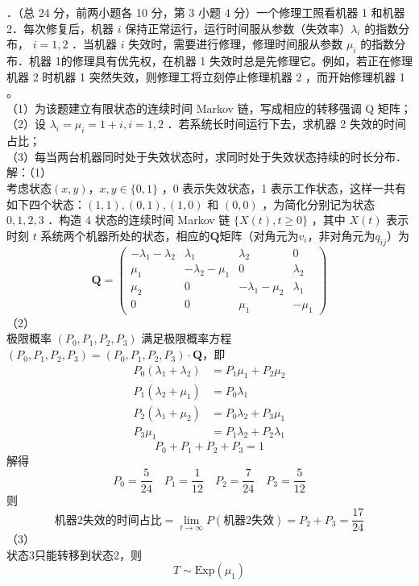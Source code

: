 \documentclass[UTF8,openany]{book}
\begin{document}
．（总 24 分，前两小题各 10 分，第 3 小题 4 分）一个修理工照看机器 1 和机器\\
2．每次修复后，机器 $i$ 保持正常运行，运行时间服从参数（失效率）$\lambda_{i}$ 的指数分布， $i=1,2$ ．当机器 $i$ 失效时，需要进行修理，修理时间服从参数 $\mu_{i}$ 的指数分布．机器 1的修理具有优先权，在机器 1 失效时总是先修理它。例如，若正在修理机器 2 时机器 1 突然失效，则修理工将立刻停止修理机器 2 ，而开始修理机器 1 。\\
（1）为该题建立有限状态的连续时间 Markov 链，写成相应的转移强调 Q 矩阵；\\
（2）设 $\lambda_{i}=\mu_{i}=1+i, i=1,2$ ．若系统长时间运行下去，求机器 2 失效的时间占比；\\
（3）每当两台机器同时处于失效状态时，求同时处于失效状态持续的时长分布．\\
解：（1）\\
考虑状态$(x, y)$，$ x, y \in\{0,1\}$ ，0 表示失效状态，1 表示工作状态，这样一共有如下四个状态：$(1,1),(0,1),(1,0)$ 和 $(0,0)$ ，为简化分别记为状态 $0,1,2,3$ ．构造 4 状态的连续时间 Markov 链 $\{X(t), t \geq 0\}$ ，其中 $X(t)$ 表示时刻 $t$ 系统两个机器所处的状态，相应的$\mathbf{Q}$矩阵（对角元为$v_i$，非对角元为$q_{ij}$）为
$$
\mathbf{Q}=
\begin{pmatrix}
	-\lambda_{1}-\lambda_{2} & \lambda_{1} & \lambda_{2} & 0 \\
	\mu_{1} & -\lambda_{2}-\mu_{1} & 0 & \lambda_{2} \\
	\mu_{2} & 0 & -\lambda_{1}-\mu_{2} & \lambda_{1} \\
	0 & 0 & \mu_{1} & -\mu_{1}
\end{pmatrix}
$$
（2）\\
极限概率 $\left(P_{0}, P_{1}, P_{2}, P_{3}\right)$ 满足极限概率方程$
\left(P_{0}, P_{1}, P_{2}, P_{3}\right)=\left(P_{0}, P_{1}, P_{2}, P_{3}\right) \cdot \mathbf{Q}
$，即\\
$$
\begin{aligned}
	P_0(\lambda_1+\lambda_2)&=P_1\mu_1+P_2\mu_2 \\
	P_1(\lambda_2+\mu_1)&=P_0\lambda_1 \\
	P_2(\lambda_1+\mu_2)&=P_0\lambda_2+P_3\mu_1\\
	P_3\mu_1&=P_1\lambda_2+P_2\lambda_1
\end{aligned}
$$
\[
P_0+P_1+P_2+P_3=1
\]
解得
\[
P_0=\frac{5}{24} \quad P_1=\frac{1}{12} \quad P_2=\frac{7}{24} \quad P_3=\frac{5}{12} 
\]
则
\[
\text{机器2失效的时间占比}= \lim_{t \rightarrow \infty}P(\text{机器2失效})=P_2+P_3=\frac{17}{24}
\]
（3）\\
状态3只能转移到状态2，则\\
\[
T\sim \mathrm{Exp}(\mu_1)
\]\\
\end{document}
